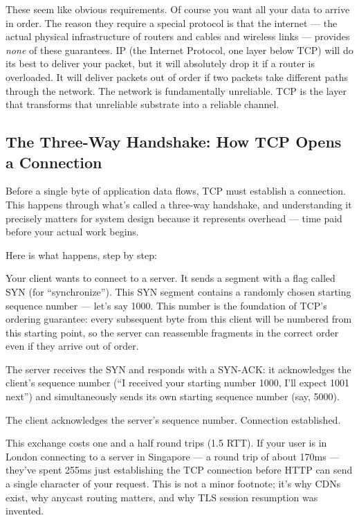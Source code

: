 \documentclass[11pt,a4paper]{article}
\begin{document}
These seem like obvious requirements. Of course you want all your data to arrive in order. The reason they require a special protocol is that the internet --- the actual physical infrastructure of routers and cables and wireless links --- provides \emph{none} of these guarantees. IP (the Internet Protocol, one layer below TCP) will do its best to deliver your packet, but it will absolutely drop it if a router is overloaded. It will deliver packets out of order if two packets take different paths through the network. The network is fundamentally unreliable. TCP is the layer that transforms that unreliable substrate into a reliable channel.

\subsection{The Three-Way Handshake: How TCP Opens a Connection}

Before a single byte of application data flows, TCP must establish a connection. This happens through what's called a three-way handshake, and understanding it precisely matters for system design because it represents overhead --- time paid before your actual work begins.

Here is what happens, step by step:

Your client wants to connect to a server. It sends a segment with a flag called SYN (for ``synchronize''). This SYN segment contains a randomly chosen starting sequence number --- let's say 1000. This number is the foundation of TCP's ordering guarantee: every subsequent byte from this client will be numbered from this starting point, so the server can reassemble fragments in the correct order even if they arrive out of order.

The server receives the SYN and responds with a SYN-ACK: it acknowledges the client's sequence number (``I received your starting number 1000, I'll expect 1001 next'') and simultaneously sends its own starting sequence number (say, 5000).

The client acknowledges the server's sequence number. Connection established.

This exchange costs one and a half round trips (1.5 RTT). If your user is in London connecting to a server in Singapore --- a round trip of about 170ms --- they've spent 255ms just establishing the TCP connection before HTTP can send a single character of your request. This is not a minor footnote; it's why CDNs exist, why anycast routing matters, and why TLS session resumption was invented.
\end{document}
